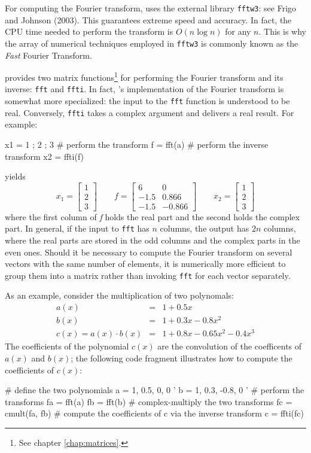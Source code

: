 For computing the Fourier transform,  uses the external
library \texttt{fftw3}: see Frigo and Johnson (2003). This guarantees
extreme speed and accuracy. In fact, the CPU time needed to perform
the transform is $O(n \log n)$ for any $n$. This is why the array of
numerical techniques employed in \texttt{fftw3} is commonly known as
the \emph{Fast} Fourier Transform.

 provides two matrix functions\footnote{See chapter
  \ref{chap:matrices}.} for performing the Fourier transform and its
inverse: \texttt{fft} and \texttt{ffti}. In fact, 's
implementation of the Fourier transform is somewhat more specialized:
the input to the \texttt{fft} function is understood to be real.
Conversely, \texttt{ffti} takes a complex argument and delivers a real
result. For example:
\begin{code}
x1 = { 1 ; 2 ; 3 }
# perform the transform
f = fft(a)
# perform the inverse transform
x2 = ffti(f)
\end{code}
yields
\[
  x_1 = \left[ \begin{array}{c} 1 \\ 2 \\ 3 \end{array} \right] 
  \qquad
  f = \left[ \begin{array}{rr} 
      6 & 0 \\ -1.5 & 0.866 \\ -1.5 & -0.866 
   \end{array} \right] 
  \qquad
  x_2 = \left[ \begin{array}{c} 1 \\ 2 \\ 3 \end{array} \right] 
\]
where the first column of \emph{f} holds the real part and the second
holds the complex part. In general, if the input to \texttt{fft} has
$n$ columns, the output has $2n$ columns, where the real parts are
stored in the odd columns and the complex parts in the even
ones. Should it be necessary to compute the Fourier transform on
several vectors with the same number of elements, it is numerically more
efficient to group them into a matrix rather than invoking
\texttt{fft} for each vector separately.

As an example, consider the multiplication of two polynomals:
\begin{eqnarray*}
  a(x) & = & 1 + 0.5 x \\
  b(x) & = & 1 + 0.3 x - 0.8 x^2 \\
  c(x) = a(x) \cdot b(x) & = & 1 + 0.8 x - 0.65 x^2 - 0.4 x^3
\end{eqnarray*}
The coefficients of the polynomial $c(x)$ are the convolution of the
coefficents of $a(x)$ and $b(x)$; the following  code fragment
illustrates how to compute the coefficients of $c(x)$:
\begin{code}
# define the two polynomials
a = { 1, 0.5, 0, 0 }'
b = { 1, 0.3, -0.8, 0 }'
# perform the transforms
fa = fft(a)
fb = fft(b)
# complex-multiply the two transforms 
fc = cmult(fa, fb)
# compute the coefficients of c via the inverse transform
c = ffti(fc)
\end{code}

